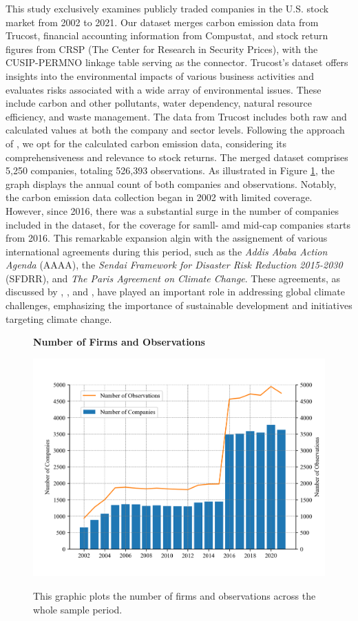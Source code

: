 \documentclass[12pt]{article}
\begin{document}
This study exclusively examines publicly traded companies in the U.S. stock market from 2002 to 2021. Our dataset merges carbon emission data from Trucost, financial accounting information from Compustat, and stock return figures from CRSP (The Center for Research in Security Prices), with the CUSIP-PERMNO linkage table serving as the connector. Trucost's dataset offers insights into the environmental impacts of various business activities and evaluates risks associated with a wide array of environmental issues. These include carbon and other pollutants, water dependency, natural resource efficiency, and waste management. The data from Trucost includes both raw and calculated values at both the company and sector levels. Following the approach of \citet{aswani2023carbon}, we opt for the calculated carbon emission data, considering its comprehensiveness and relevance to stock returns. The merged dataset comprises 5,250 companies, totaling 526,393 observations. As illustrated in Figure \ref{fig: num}, the graph displays the annual count of both companies and observations. Notably, the carbon emission data collection began in 2002 with limited coverage. However, since 2016, there was a substantial surge in the number of companies included in the dataset, for the coverage for samll- amd mid-cap companies starts from 2016. This remarkable expansion algin with the assignement of various international agreements during this period, such as the \textit{Addis Ababa Action Agenda} (AAAA), the \textit{Sendai Framework for Disaster Risk Reduction 2015-2030} (SFDRR), and \textit{The Paris Agreement on Climate Change}. These agreements, as discussed by \cite{engberg2021influence}, \cite{kelman2015climate}, and \cite{dimitrov2016paris}, have played an important role in addressing global climate challenges, emphasizing the importance of sustainable development and initiatives targeting climate change.

\begin{figure}[!ht]
\centering
\caption{\textbf{Number of Firms and Observations}}
\includegraphics{graphics/number_obs.png}
\label{fig: num}
\caption*{\footnotesize{This graphic plots the number of firms and observations across the whole sample period.}}
\end{figure}
\end{document}
